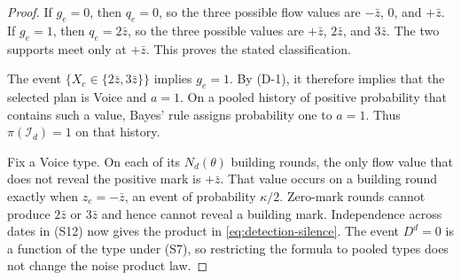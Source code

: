 \begin{proof}
If $g_e=0$, then $q_e=0$, so the three possible flow values are
$-\bar z$, $0$, and $+\bar z$. If $g_e=1$, then $q_e=2\bar z$, so the three possible values are
$+\bar z$, $2\bar z$, and $3\bar z$. The two supports meet only at $+\bar z$. This proves the
stated classification.

The event $\{X_e\in\{2\bar z,3\bar z\}\}$ implies $g_e=1$. By (D-1), it therefore implies that
the selected plan is Voice and $a=1$. On a pooled history of positive probability that contains
such a value, Bayes' rule assigns probability one to $a=1$. Thus
$\pi(\mathcal I_d)=1$ on that history.

Fix a Voice type. On each of its $N_d(\theta)$ building rounds, the only flow value
that does not reveal the positive mark is $+\bar z$. That value occurs on a building round
exactly when $z_e=-\bar z$, an event of probability $\kappa/2$. Zero-mark rounds cannot produce
$2\bar z$ or $3\bar z$ and hence cannot reveal a building mark. Independence across dates in
(S12) now gives the product in \eqref{eq:detection-silence}. The event $D^d=0$ is a function of
the type under (S7), so restricting the formula to pooled types does not change the noise product
law.
\end{proof}

